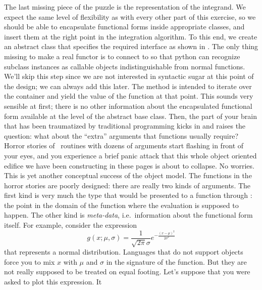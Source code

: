 The last missing piece of the puzzle is the representation of the integrand. We expect the same
level of flexibility as with every other part of this exercise, so we should be able to
encapsulate functional forms inside appropriate classes, and insert them at the right point in
the integration algorithm. To this end, we create an abstract class  that
specifies the required interface as shown in . The only thing
missing to make  a real functor is to connect  to
 so that python can recognize subclass instances as callable objects
indistinguishable from normal functions. We'll skip this step since we are not interested in
syntactic sugar at this point of the design; we can always add this later.
%
%
The method  is intended to iterate over the container  and
yield the value of the function at that point. This sounds very sensible at first; there is no
other information about the encapsulated functional form available at the level of the
abstract base class. Then, the part of your brain that has been traumatized by traditional
programming kicks in and raises the question: what about the ``extra'' arguments that functions
usually require? Horror stories of \fortran\ routines with dozens of arguments start flashing
in front of your eyes, and you experience a brief panic attack that this whole object oriented
edifice we have been constructing in these pages is about to collapse. No worries. This is yet
another conceptual success of the object model. The functions in the horror stories are poorly
designed: there are really two kinds of arguments. The first kind is very much the type that
would be presented to a function through : the point in the domain of the
function where the evaluation is supposed to happen. The other kind is {\em meta-data},
i.e.~information about the functional form itself. For example, consider the expression
\begin{equation}
  g(x; \mu,\sigma) = \frac{1}{\sqrt{2\pi} \sigma} e^{-\frac{(x-\mu)^2}{2\sigma^2}}
\label{eq:gaussian}
\end{equation}
that represents a normal distribution. Languages that do not support objects force you to mix
$x$ with $\mu$ and $\sigma$ in the signature of the function. But they are not really supposed
to be treated on equal footing. Let's suppose that you were asked to plot this expression. It
